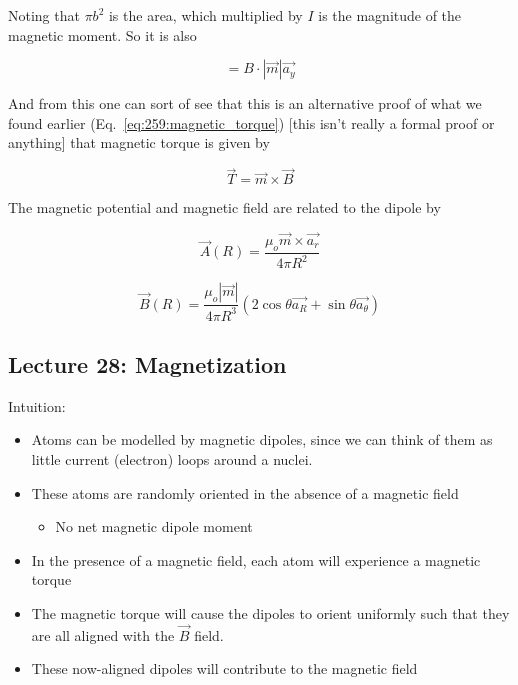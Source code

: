 \documentclass[10pt]{article}
\begin{document}
Noting that $ \pi b^2 $  is the area, which multiplied by $ I $ is the magnitude of the magnetic moment. So it is also

\begin{equation}
	 = B \cdot  | \vec{m} | \vec{a_y}
\end{equation}

And from this one can sort of see that this is an alternative proof of what we found earlier (Eq.~\ref{eq:259:magnetic_torque}) [this isn't really a formal proof or anything] that magnetic torque is given by

\begin{equation}
	\vec{T} = \vec{m} \times \vec{B}
\end{equation}


The magnetic potential and magnetic field are related to the dipole by



\begin{equation}
	\vec{A}(R) = \frac{\mu_o \vec{m} \times  \vec{a_r} }{4\pi R^2}
	\label{eq:259:magnetic_potential_dipole}
\end{equation}



\begin{equation}
	\vec{B}(R) = \frac{\mu_o |\vec{m}|}{4\pi R^3} \left( 2\cos \theta \vec{a_R} + \sin \theta \vec{a_\theta} \right) 
	\label{eq:259:magnetic_field_dipole}
\end{equation}
 













\subsection{Lecture 28: Magnetization}

Intuition:

\begin{itemize}
	\item Atoms can be modelled by magnetic dipoles, since we can think of them as little current (electron) loops around a nuclei.
	\item These atoms are randomly oriented in the absence of a magnetic field
		\begin{itemize}
			\item No net magnetic dipole moment
		\end{itemize}
	\item In the presence of a magnetic field, each atom will experience a magnetic torque 
	\item The magnetic torque will cause the dipoles to orient uniformly such that they are all aligned with the $\vec{B} $ field.
	\item These now-aligned dipoles will contribute to the magnetic field
\end{itemize}
\end{document}
